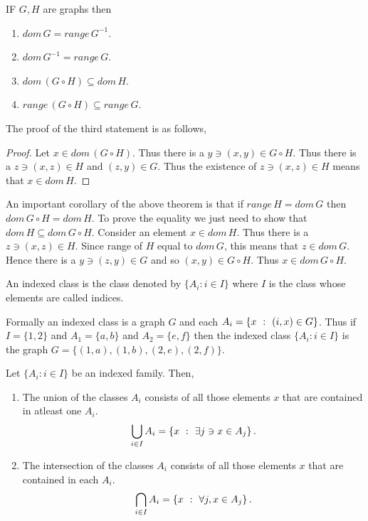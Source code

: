 \begin{Theorem}
    IF $G,H$ are graphs then
    \begin{enumerate}
	\item $dom\,G = range\,G^{-1}$.
	\item $dom\,G^{-1} = range\,G$.
	\item $dom\,(G \circ H) \subseteq dom\,H$.
	\item $range\,(G \circ H) \subseteq range\,G$.
    \end{enumerate}
\end{Theorem}

The proof of the third statement is as follows,
\begin{proof}
    Let $x \in dom\,(G \circ H)$. Thus there is a $y \ni (x,y) \in G \circ H$. Thus there
    is a $z \ni (x,z) \in H$ and $(z,y) \in G$. Thus the existence of $z \ni (x,z) \in H$
    means that $x \in dom\,H$.
\end{proof}

An important corollary of the above theorem is that if $range\,H = dom\,G$ then $dom\,G\circ H =
dom\,H$. To prove the equality we just need to show that $dom\, H \subseteq dom\,G\circ H$. Consider
an element $x \in dom\,H$. Thus there is a $z \ni (x,z) \in H$. Since range of $H$ equal to
$dom\,G$, this means that $z \in dom\,G$. Hence there is a $y \ni (z,y) \in G$ and so 
$(x,y) \in G\circ H$. Thus $x \in dom\,G\circ H$.

\begin{Definition}
    An indexed class is the class denoted by $\lbrace A_i : i \in I \rbrace$ where $I$ is the class
    whose elements are called indices.
\end{Definition}
Formally an indexed class is a graph $G$ and each $A_i = \left\lbrace{x\hspace{0.05in}}:{\hspace{0.05in}(i,x) \in G} \right\rbrace$. Thus if $I =
\lbrace 1,2\rbrace$ and $A_1 = \lbrace a,b \rbrace $ and $A_2 = \lbrace e , f \rbrace$ then the
indexed class $\lbrace A_i : i \in I \rbrace$ is the graph $G = \lbrace (1,a) , (1,b) , (2,e), (2,f)
\rbrace$.

\begin{Definition}
    Let $\lbrace A_i : i \in I \rbrace$ be an indexed family. Then,
    \begin{enumerate}
	\item The union of the classes $A_i$ consists of all those elements $x$ that are contained
	    in atleast one $A_i$. 
	    \begin{equation*}
		\bigcup_{i \in I} A_i = \left\lbrace{x\hspace{0.05in}}:{\hspace{0.05in}\exists j \ni x \in A_j} \right\rbrace.
	    \end{equation*}
	\item The intersection of the classes $A_i$ consists of all those elements $x$ that are 
	    contained in each $A_i$. 
	    \begin{equation*}
		\bigcap_{i \in I} A_i = \left\lbrace{x\hspace{0.05in}}:{\hspace{0.05in}\forall j, x \in A_j} \right\rbrace.
	    \end{equation*}
    \end{enumerate}
\end{Definition}

